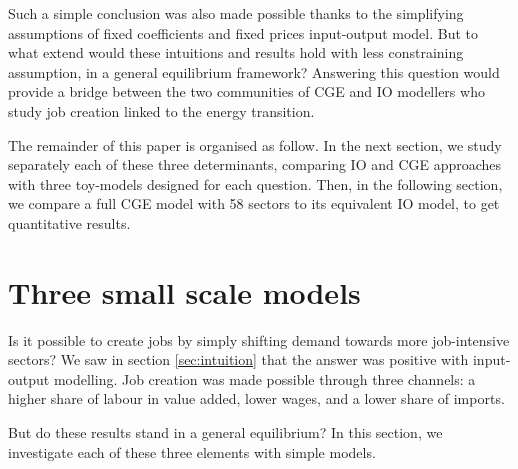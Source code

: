 Such a simple conclusion was also made possible thanks to the simplifying assumptions of fixed coefficients and fixed prices input-output model.
But to what extend would these intuitions and results hold with less constraining assumption, in a general equilibrium framework?
Answering this question would provide a bridge between the two communities of CGE and IO modellers who study job creation linked to the energy transition.

The remainder of this paper is organised as follow.
In the next section, we study separately each of these three determinants, comparing IO and CGE approaches with three toy-models designed for each question. 
Then, in the following section, we compare a full CGE model with 58 sectors to its equivalent IO model, to get quantitative results.



\section{Three small scale models} \label{sec:smallModels}
Is it possible to create jobs by simply shifting demand towards more job-intensive sectors? We saw in section \ref{sec:intuition} that the answer was positive with input-output modelling. 
Job creation was made possible through three channels: a higher share of labour in value added, lower wages, and a lower share of imports. 

But do these results stand in a general equilibrium? In this section, we investigate each of these three elements with simple models.

